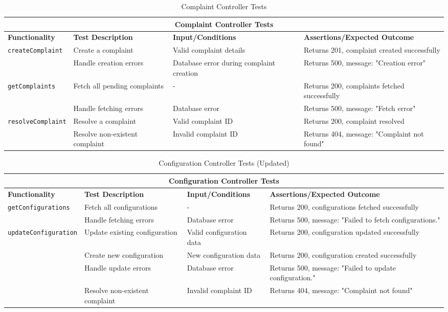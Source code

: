 \begin{table}[ht]
\centering
\begin{tabular}{|p{3.2cm}|p{4cm}|p{3.5cm}|p{5cm}|}
\hline
\multicolumn{4}{|c|}{\textbf{Complaint Controller Tests}} \\
\hline
\textbf{Functionality} & \textbf{Test Description} & \textbf{Input/Conditions} & \textbf{Assertions/Expected Outcome} \\
\hline
\multirow{2}{*}{\texttt{createComplaint}}
 & Create a complaint
 & Valid complaint details
 & Returns 201, complaint created successfully \\ \cline{2-4}
 & Handle creation errors
 & Database error during complaint creation
 & Returns 500, message: "Creation error" \\
\hline
\multirow{2}{*}{\texttt{getComplaints}}
 & Fetch all pending complaints
 & -
 & Returns 200, complaints fetched successfully \\ \cline{2-4}
 & Handle fetching errors
 & Database error
 & Returns 500, message: "Fetch error" \\
\hline
\multirow{2}{*}{\texttt{resolveComplaint}}
 & Resolve a complaint
 & Valid complaint ID
 & Returns 200, complaint resolved \\ \cline{2-4}
 & Resolve non-existent complaint
 & Invalid complaint ID
 & Returns 404, message: "Complaint not found" \\
\hline
\end{tabular}
\caption{Complaint Controller Tests}
\label{tab:complaint_controller_tests}
\end{table}

\begin{table}[ht]
\centering
\begin{tabular}{|p{4.2cm}|p{4cm}|p{3.5cm}|p{5cm}|}
\hline
\multicolumn{4}{|c|}{\textbf{Configuration Controller Tests}} \\
\hline
\textbf{Functionality} & \textbf{Test Description} & \textbf{Input/Conditions} & \textbf{Assertions/Expected Outcome} \\
\hline
\multirow{2}{*}{\texttt{getConfigurations}}
 & Fetch all configurations
 & -
 & Returns 200, configurations fetched successfully \\ \cline{2-4}
 & Handle fetching errors
 & Database error
 & Returns 500, message: "Failed to fetch configurations." \\
\hline
\multirow{4}{*}{\texttt{updateConfiguration}}
 & Update existing configuration
 & Valid configuration data
 & Returns 200, configuration updated successfully \\ \cline{2-4}
 & Create new configuration
 & New configuration data
 & Returns 200, configuration created successfully \\ \cline{2-4}
 & Handle update errors
 & Database error
 & Returns 500, message: "Failed to update configuration." \\ \cline{2-4}
 & Resolve non-existent complaint
 & Invalid complaint ID
 & Returns 404, message: "Complaint not found" \\ \cline{2-4}
\hline
\end{tabular}
\caption{Configuration Controller Tests (Updated)}
\label{tab:configuration_controller_tests}
\end{table}

